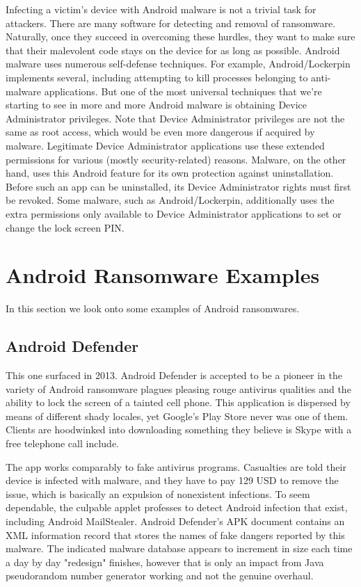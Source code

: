 Infecting a victim's device with Android malware is not a trivial task for attackers. 
There are many software for detecting and removal of ransomware.
Naturally, once they succeed in overcoming these hurdles, they want to make sure that their malevolent code stays on the device for as long as possible. 
Android malware uses numerous self-defense techniques. 
For example, Android/Lockerpin implements several, including attempting to kill processes belonging to anti-malware applications.
But one of the most universal techniques that we’re starting to see in more and more Android malware is obtaining Device Administrator privileges. 
Note that Device Administrator privileges are not the same as root access, which would be even more dangerous if acquired by malware.
Legitimate Device Administrator applications use these extended permissions for various (mostly security-related) reasons. 
Malware, on the other hand, uses this Android feature for its own protection against uninstallation. 
Before such an app can be uninstalled, its Device Administrator rights must first be revoked.
Some malware, such as Android/Lockerpin, additionally uses the extra permissions only available to Device Administrator applications to set or change the lock screen PIN.

\section{Android Ransomware Examples}

In this section we look onto some examples of Android ransomwares.

\subsection{Android Defender}

This one surfaced in 2013. 
Android Defender is accepted to be a pioneer in the variety of Android ransomware plagues pleasing rouge antivirus qualities and the ability to lock the screen of a tainted cell phone. 
This application is dispersed by means of different shady locales, yet Google's Play Store never was one of them. 
Clients are hoodwinked into downloading something they believe is Skype with a free telephone call include.

The app works comparably to fake antivirus programs. 
Casualties are told their device is infected with malware, and they have to pay 129 USD to remove the issue, which is basically an expulsion of nonexistent infections. 
To seem dependable, the culpable applet professes to detect Android infection that exist, including Android MailStealer. 
Android Defender's APK document contains an XML information record that stores the names of fake dangers reported by this malware. 
The indicated malware database appears to increment in size each time a day by day "redesign" finishes, however that is only an impact from Java pseudorandom number generator working and not the genuine overhaul.

